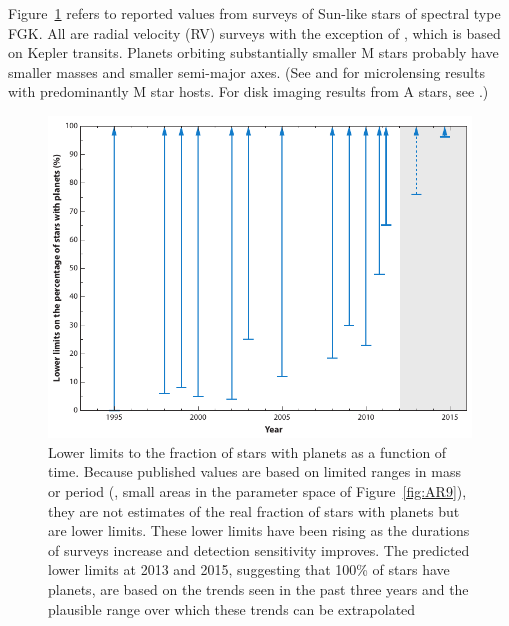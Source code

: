 Figure~\ref{fig:AR8} refers to reported values from surveys of Sun-like stars of spectral type FGK. All are radial velocity (RV) surveys with the exception of \citet{Howard2012}, which is based on Kepler transits. Planets orbiting substantially smaller M stars probably have smaller masses \citep{Johnson2010} and smaller semi-major axes. (See \citet{Gould2010} and \citet{Cassan2012} for microlensing results with predominantly M star hosts. For disk imaging results from A stars, see \citet{Bowler2010}.)
\begin{figure}[!hbt]
	\centering
	\includegraphics[width=0.9\linewidth]{figures/AnnRevs/AR8.pdf}
	\caption[Fraction of stars with planets]{Lower limits to the fraction of stars with planets as a function of time. Because published values are based on limited ranges in mass or period (\ie, small areas in the parameter space of Figure~\ref{fig:AR9}), they are not estimates of the real fraction of stars with planets but are lower limits. These lower limits have been rising as the durations of surveys increase and detection sensitivity improves. The predicted lower limits at 2013 and 2015, suggesting that 100\% of stars have planets, are based on the trends seen in the past three years and the plausible range over which these trends can be extrapolated}
	\label{fig:AR8}
\end{figure}


